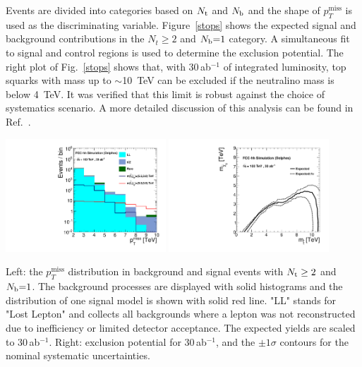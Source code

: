 \documentclass[11pt,twoside,a4paper]{cernrep}
\begin{document}
Events are divided into categories based on $N_{\rm t}$ and $N_{\rm b}$ and the shape of $p_T^{\mathrm{miss}}$ is used as the discriminating variable. Figure~\ref{stops} shows the expected signal and background contributions in the $N_t \geq 2$ and $N_{\rm b}{=}1$ category. A simultaneous fit to signal and control regions is used to determine the exclusion potential. The right plot of Fig.~\ref{stops} shows that, with 30\,ab$^{-1}$ of integrated luminosity, top squarks with mass up to $\sim$10~TeV can be excluded if the neutralino mass is below 4~TeV. It was verified that this limit is robust against the choice of systematics scenario. A more detailed discussion of this analysis can be found in Ref.~\cite{Gouskos:2642475}.
%
%
%
\begin{Figure}
  \centering
  \includegraphics[width= 0.45\textwidth]{sr_1.pdf}
  \includegraphics[width= 0.45\textwidth]{lim_30ab_comb.pdf}
  \caption{Left: the $p_T^{\mathrm{miss}}$ distribution in background and signal events with $N_{\rm t} \geq 2$ and $N_{\rm b}{=}1$. The background processes are displayed with solid histograms and the distribution of one signal model is shown with solid red line. "LL" stands for "Lost Lepton" and collects all backgrounds where a lepton was not reconstructed due to inefficiency or limited detector acceptance. The expected yields are scaled to 30\,ab$^{-1}$. Right: exclusion potential for 30\,ab$^{-1}$, and the $\pm 1\sigma$ contours for the nominal systematic uncertainties.}
  \label{stops}
\end{Figure}
\end{document}
